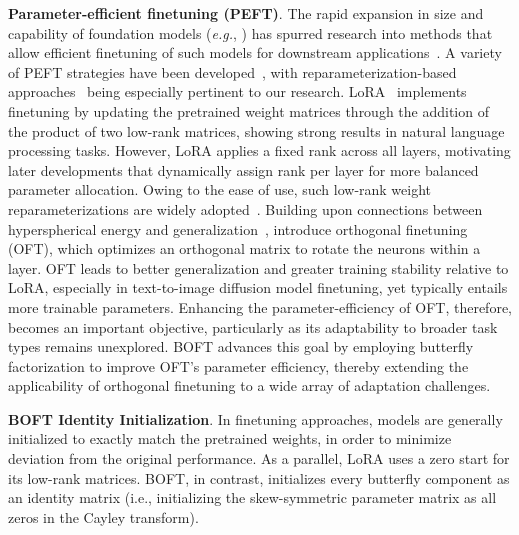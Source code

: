 \textbf{Parameter-efficient finetuning (PEFT)}. The rapid expansion in size and capability of foundation models (\emph{e.g.}, \cite{brown2020language,radford2021learning,rombach2022high,kirillov2023segment}) has spurred research into methods that allow efficient finetuning of such models for downstream applications~\cite{treviso2023efficient,ding2023parameter,lialin2023scaling}. A variety of PEFT strategies have been developed~\cite{houlsby2019parameter,aghajanyan2020intrinsic,hulora2022,edalati2022krona,wang2022adamix,gheini2021cross,zaken2022bitfit,guo2020parameter,sung2021training,ansell2022composable,lester2021power,li2021prefix,vu2022spot,he2021towards,mao2021unipelt,karimi2021compacter,liu2022few,sung2022lst,chen2022parameter,jia2022visual,chen2022adaptformer,zhang2022neural,jie2023fact,lian2022scaling,luo2023towards}, with reparameterization-based approaches~\cite{aghajanyan2020intrinsic,hulora2022,edalati2022krona} being especially pertinent to our research. LoRA~\cite{hulora2022} implements finetuning by updating the pretrained weight matrices through the addition of the product of two low-rank matrices, showing strong results in natural language processing tasks. However, LoRA applies a fixed rank across all layers, motivating later developments \cite{zhang2022adaptive,valipour2022dylora,zhang2023increlora} that dynamically assign rank per layer for more balanced parameter allocation. Owing to the ease of use, such low-rank weight reparameterizations are widely adopted~\cite{dettmers2023qlora,zi2023delta,chavan2023one}. Building upon connections between hyperspherical energy and generalization~\cite{liu2018learning,liu2021orthogonal}, \cite{qiu2023controlling} introduce orthogonal finetuning (OFT), which optimizes an orthogonal matrix to rotate the neurons within a layer. OFT leads to better generalization and greater training stability relative to LoRA, especially in text-to-image diffusion model finetuning, yet typically entails more trainable parameters. Enhancing the parameter-efficiency of OFT, therefore, becomes an important objective, particularly as its adaptability to broader task types remains unexplored. BOFT advances this goal by employing butterfly factorization to improve OFT’s parameter efficiency, thereby extending the applicability of orthogonal finetuning to a wide array of adaptation challenges.

\textbf{BOFT Identity Initialization}. In finetuning approaches, models are generally initialized to exactly match the pretrained weights, in order to minimize deviation from the original performance. As a parallel, LoRA uses a zero start for its low-rank matrices. BOFT, in contrast, initializes every butterfly component as an identity matrix (i.e., initializing the skew-symmetric parameter matrix as all zeros in the Cayley transform).

